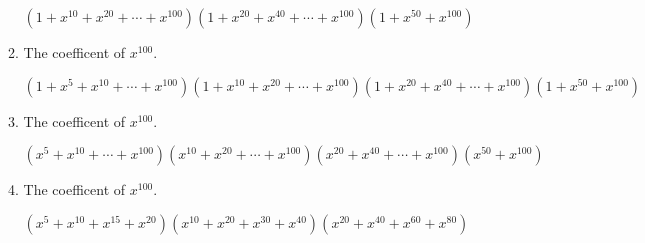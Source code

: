 \documentclass{../../cls/sig-alternate-05-2015}
\begin{document}
\begin{enumerate}
\begin{enumerate}
         $(1+x^{10}+x^{20}+\cdots+x^{100})(1+x^{20}+x^{40}+\cdots+x^{100})(1+x^{50}+x^{100})$
         
         \item The coefficent of $x^{100}$.
         
         $(1+x^{5}+x^{10}+\cdots+x^{100})(1+x^{10}+x^{20}+\cdots+x^{100})(1+x^{20}+x^{40}+\cdots+x^{100})(1+x^{50}+x^{100})$
         
         \item The coefficent of $x^{100}$.
         
         $(x^{5}+x^{10}+\cdots+x^{100})(x^{10}+x^{20}+\cdots+x^{100})(x^{20}+x^{40}+\cdots+x^{100})(x^{50}+x^{100})$
         
         \item The coefficent of $x^{100}$.
         
         $(x^{5}+x^{10}+ x^{15}+x^{20})(x^{10}+x^{20}+x^{30}+x^{40})(x^{20}+x^{40}+x^{60}+x^{80})$
    \end{enumerate}
\end{enumerate}
\end{document}
